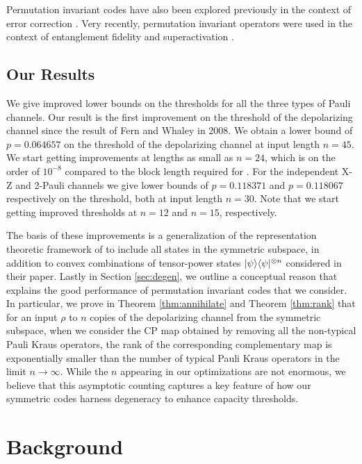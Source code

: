 \documentclass[11pt]{article}
\DeclarePairedDelimiter\bra{\langle}{\rvert}
\DeclarePairedDelimiter\ket{\lvert}{\rangle}
\begin{document}
Permutation invariant codes have also been explored previously in the context of error correction \cite{pollatsek2004permutationally,ouyang2026theory}. Very recently, permutation invariant operators were used in the context of entanglement fidelity and superactivation \cite{bergh2026permutationinvariantoptimizationproblems,parentin2026onsetsuperactivationquantumcapacity}.

\subsection{Our Results}
We give improved lower bounds on the thresholds for all the three types of Pauli channels. Our result is the first improvement on the threshold of the depolarizing channel since the result of Fern and Whaley \cite{fern} in 2008. We obtain a lower bound of $p = 0.064657$ on the threshold of the depolarizing channel at input length $n = 45$. We start getting improvements at lengths as small as $n = 24$, which is on the order of $10^{-8}$ compared to the block length required for \cite{fern}. For the independent X-Z and 2-Pauli channels we give lower bounds of $p = 0.118371$ and $p = 0.118067$ respectively on the threshold, both at input length $n = 30$. Note that we start getting improved thresholds at $n = 12$ and $n=15$, respectively.

The basis of these improvements is a generalization of the representation theoretic framework of \cite{bhalerao2025improvingquantumcommunicationrates} to include all states in the symmetric subspace, in addition to convex combinations of tensor-power states $\ket{\psi}\bra{\psi}^{\otimes n}$ considered in their paper. Lastly in Section \ref{sec:degen}, we outline a conceptual reason that explains the good performance of permutation invariant codes that we consider. In particular, we prove in Theorem \ref{thm:annihilate} and Theorem \ref{thm:rank} that for an input $\rho$ to $n$ copies of the depolarizing channel from the symmetric subspace, when we consider the CP map obtained by removing all the non-typical Pauli Kraus operators, the rank of the corresponding complementary map is exponentially smaller than the number of typical Pauli Kraus operators in the limit $n \rightarrow \infty$.  While the $n$ appearing in our optimizations are not enormous, we believe that this asymptotic counting captures  a key feature of how our symmetric codes harness degeneracy to enhance capacity thresholds.

\section{Background}
\label{sectionbackground}
\end{document}
